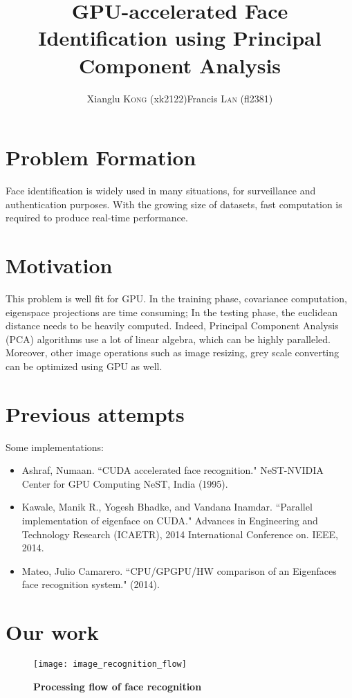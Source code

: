 \documentclass[12pt]{article}
\title{GPU-accelerated Face Identification using Principal Component Analysis}
\date{}
\author{Xianglu \textsc{Kong} (xk2122)\quad \quad \quad \quad \quad  Francis \textsc{Lan} (fl2381)}
\begin{document}
\maketitle

\section{Problem Formation}
Face identification is widely used in many situations, for surveillance and authentication purposes. With the growing size of datasets, fast computation is required to produce real-time performance.

\section{Motivation}
This problem is well fit for GPU. In the training phase, covariance computation, eigenspace projections are time consuming; In the testing phase, the euclidean distance needs to be heavily computed. Indeed, Principal Component Analysis (PCA) algorithms use a lot of linear algebra, which can be highly paralleled. Moreover, other image operations such as image resizing, grey scale converting can be optimized using GPU as well.

\section{Previous attempts}
Some implementations:
\begin{itemize}
\item Ashraf, Numaan. ``CUDA accelerated face recognition." NeST-NVIDIA Center for GPU Computing NeST, India (1995).
\item Kawale, Manik R., Yogesh Bhadke, and Vandana Inamdar. ``Parallel implementation of eigenface on CUDA." Advances in Engineering and Technology Research (ICAETR), 2014 International Conference on. IEEE, 2014.
\item Mateo, Julio Camarero. ``CPU/GPGPU/HW comparison of an Eigenfaces face recognition system." (2014).
\end{itemize}

\section{Our work}

\begin{figure}[h]
\centering
\texttt{[image: image\_recognition\_flow]}
\caption{\bf Processing flow of face recognition} 
\label{fig1}
\end{figure}
\end{document}
